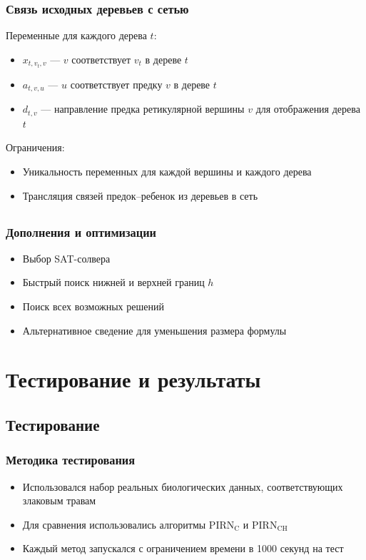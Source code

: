 \documentclass[hyperref={unicode}]{beamer}
\begin{document}
\begin{frame}
\frametitle{Связь исходных деревьев с сетью}

Переменные для каждого дерева $t$:

\begin{itemize}
	\item $x_{t, v_t, v}$ --- $v$ соответствует $v_t$ в дереве $t$
	\item $a_{t, v, u}$ --- $u$ соответствует предку $v$ в дереве $t$
	\item $d_{t, v}$ --- направление предка ретикулярной вершины $v$ для отображения дерева $t$
\end{itemize}

Ограничения:
\begin{itemize}
	\item Уникальность переменных для каждой вершины и каждого дерева
	\item Трансляция связей предок--ребенок из деревьев в сеть
\end{itemize}

\end{frame}

\subsection{}

\begin{frame}
\frametitle{Дополнения и оптимизации}

\begin{itemize}
	\item Выбор SAT-солвера
	\item Быстрый поиск нижней и верхней границ $h$
	\item Поиск всех возможных решений
	\item Альтернативное сведение для уменьшения размера формулы
\end{itemize}

\end{frame}

\section{Тестирование и результаты}

\subsection{Тестирование}

\begin{frame}
\frametitle{Методика тестирования}

\begin{itemize}
	\item Использовался набор реальных биологических данных, соответствующих злаковым травам
	\item Для сравнения использовались алгоритмы $\mathrm{PIRN_C}$ и $\mathrm{PIRN_{CH}}$
	\item Каждый метод запускался с ограничением времени в 1000 секунд на тест
\end{itemize}

\end{frame}
\end{document}
